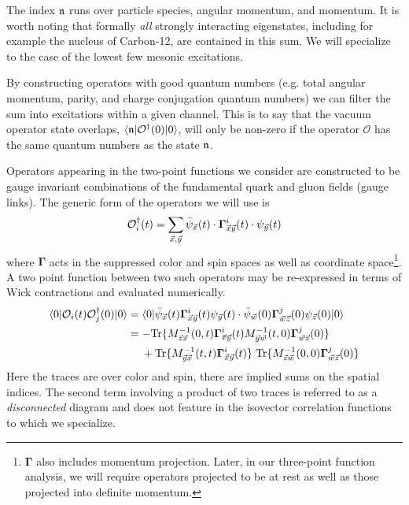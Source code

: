 The index $\mathfrak{n}$ runs over particle species, angular momentum, and momentum. It is worth noting that formally \emph{all} strongly interacting eigenstates, including for example the nucleus of Carbon-12, are contained in this sum. We will specialize to the case of the lowest few mesonic excitations. 

By constructing operators with good quantum numbers (e.g. total angular momentum, parity, and charge conjugation quantum numbers) we can filter the sum into excitations within a given channel. This is to say that the vacuum operator state overlaps, $ \langle \mathfrak{n} | \mathcal{O}^\dagger(0) | 0 \rangle $, will only be non-zero if the operator $\mathcal{O}$ has the same quantum numbers as the state $\mathfrak{n}$. 

Operators appearing in the two-point functions we consider are constructed to be gauge invariant combinations of the fundamental quark and gluon fields (gauge links).  The generic form of the operators we will use is
\begin{equation*}
\mathcal{O}_i^\dagger(t) = \sum_{\vec{x}, \vec{y} } \bar{\psi}_{\vec{x}}(t)\cdot  \mathbf{\Gamma}^i_{\vec{x} \vec{y}}(t) \cdot \psi_{\vec{y}}(t)
\end{equation*}
where $\mathbf{\Gamma}$ acts in the suppressed color and spin spaces as well as coordinate space\footnote{$\mathbf{\Gamma}$ also includes momentum projection. Later, in our three-point function analysis, we will require operators projected to be at rest as well as those projected into definite momentum.}. A two point function between two such operators may be re-expressed in terms of Wick contractions and evaluated numerically. 
\begin{align*}
 \langle 0 | \mathcal{O}_i(t) \mathcal{O}_j^\dagger(0) | 0 \rangle &= \langle 0 |\bar{\psi}_{\vec{x}}(t)\mathbf{\Gamma}^i_{\vec{x} \vec{y}}(t) \psi_{\vec{y}}(t)  \cdot \bar{\psi}_{\vec{w}}(0)\mathbf{\Gamma}^j_{\vec{w} \vec{z}}(0) \psi_{\vec{z}}(0)  | 0 \rangle \\
 &= - \mathrm{Tr}\{M^{-1}_{\vec{z}\vec{x}}(0,t)\mathbf{\Gamma}^i_{\vec{x} \vec{y}}(t)M^{-1}_{\vec{y}\vec{w}}(t,0) \mathbf{\Gamma}^j_{\vec{w} \vec{z}}(0)\} \\
 & \quad\; + \mathrm{Tr}\{M^{-1}_{\vec{y}\vec{x}}(t,t) \mathbf{\Gamma}^i_{\vec{x} \vec{y}}(t)\} \; \mathrm{Tr}\{M^{-1}_{\vec{z}\vec{w}}(0,0)\mathbf{\Gamma}^j_{\vec{w} \vec{z}}(0)\}
\end{align*}
Here the traces are over color and spin, there are implied sums on the spatial indices. The second term involving a product of two traces is referred to as a \emph{disconnected} diagram and does not feature in the isovector correlation functions to which we specialize. 

